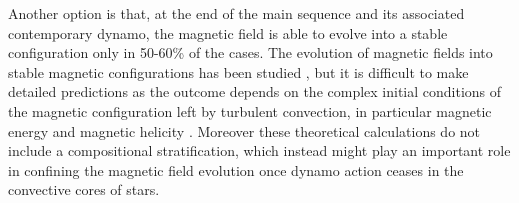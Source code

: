 Another option is that, at the end of the main sequence and its associated contemporary dynamo, the magnetic field is able to evolve into a stable configuration only in 50-60\% of the cases. The evolution of magnetic fields into stable magnetic configurations has been studied \citep{Braithwaite_2006}, but it is difficult to make detailed predictions as the outcome depends on the complex initial conditions of the magnetic configuration left by turbulent convection, in particular magnetic energy and magnetic helicity \citep{Braithwaite_2008}. Moreover these theoretical calculations do not include a compositional stratification, which instead might play an important role in confining the magnetic field evolution once dynamo action ceases in the convective cores of stars. 